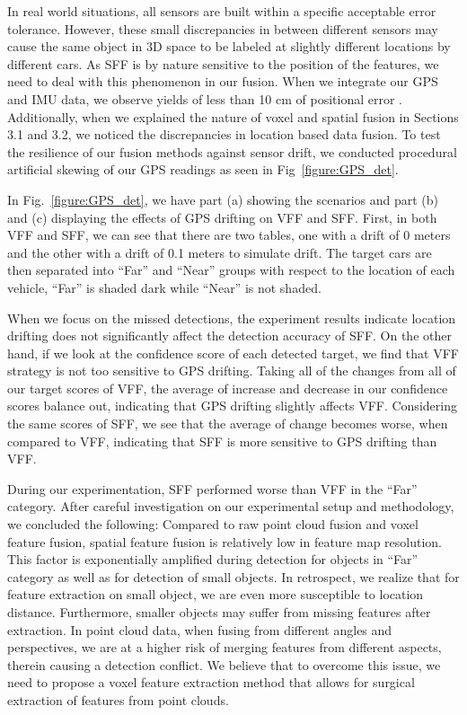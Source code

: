 \documentclass[sigconf]{acmart}
\begin{document}
In real world situations, all sensors are built within a specific acceptable error tolerance. However, these small discrepancies in between different sensors may cause the same object in 3D space to be labeled at slightly different locations by different cars. As SFF is by nature sensitive to the position of the features, we need to deal with this phenomenon in our fusion. When we integrate our GPS and IMU data, we observe yields of less than 10 cm of positional error \cite{imugps}. Additionally, when we explained the nature of voxel and spatial fusion in Sections 3.1 and 3.2, we noticed the discrepancies in location based data fusion. 
To test the resilience of our fusion methods against sensor drift, we conducted procedural artificial skewing of our GPS readings as seen in Fig~\ref{figure:GPS_det}. 



In Fig.~\ref{figure:GPS_det}, we have part (a) showing the scenarios and part (b) and (c) displaying the effects of GPS drifting on VFF and SFF. First, in both VFF and SFF, we can see that there are two tables, one with a drift of 0 meters and the other with a drift of 0.1 meters to simulate drift. The target cars are then separated into ``Far'' and ``Near'' groups with respect to the location of each vehicle, ``Far'' is shaded dark while ``Near'' is not shaded. 


When we focus on the missed detections, the experiment results indicate location drifting does not significantly affect the detection accuracy of SFF.
On the other hand, if we look at the confidence score of each detected target, we find that VFF strategy is not too sensitive to GPS drifting.
Taking all of the changes from all of our target scores of VFF, the average of increase and decrease in our confidence scores balance out, indicating that GPS drifting slightly affects VFF. Considering the same scores of SFF, we see that the average of change becomes worse, when compared to VFF, indicating that SFF is more sensitive to GPS drifting than VFF.


During our experimentation, SFF performed worse than VFF in the ``Far'' category. After careful investigation on our experimental setup and methodology, we concluded the following: Compared to raw point cloud fusion and voxel feature fusion, spatial feature fusion is relatively low in feature map resolution. This factor is exponentially amplified during detection for objects in ``Far'' category as well as for detection of small objects.
In retrospect, we realize that for feature extraction on small object, we are even more susceptible to location distance. Furthermore, smaller objects may suffer from missing features after extraction. In point cloud data, when fusing from different angles and perspectives, we are at a higher risk of merging features from different aspects, therein causing a detection conflict. We believe that to overcome this issue, we need to propose a voxel feature extraction method that allows for surgical extraction of features from point clouds.
\end{document}
